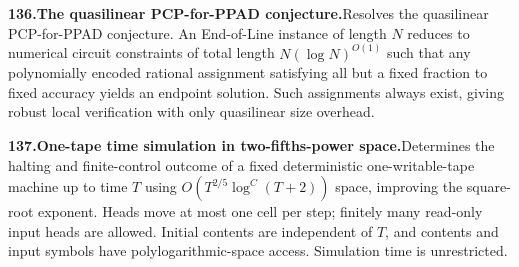 \documentclass[11pt,a4paper]{article}
\begin{document}
  \par \begin{minipage}{\linewidth}
  \fontsize{10.5}{12.6}\selectfont\RaggedRight
  \hypertarget{result 136}{}
  {\bfseries\textcolor{muted}{136.}\enspace The quasilinear PCP-for-PPAD conjecture.}\enspace Resolves the quasilinear PCP-for-PPAD conjecture. An End-of-Line instance of length $N$ reduces to numerical circuit constraints of total length $N(\log N)^{O(1)}$ such that any polynomially encoded rational assignment satisfying all but a fixed fraction to fixed accuracy yields an endpoint solution. Such assignments always exist, giving robust local verification with only quasilinear size overhead.\par
  \end{minipage}\par\vspace{5pt}



  \par \begin{minipage}{\linewidth}
  \fontsize{10.5}{12.6}\selectfont\RaggedRight
  \hypertarget{result 137}{}
  {\bfseries\textcolor{muted}{137.}\enspace One-tape time simulation in two-fifths-power space.}\enspace Determines the halting and finite-control outcome of a fixed deterministic one-writable-tape machine up to time $T$ using $O(T^{2/5}\log^C(T+2))$ space, improving the square-root exponent. Heads move at most one cell per step; finitely many read-only input heads are allowed. Initial contents are independent of $T$, and contents and input symbols have polylogarithmic-space access. Simulation time is unrestricted.\par
  \end{minipage}\par\vspace{5pt}
\end{document}
